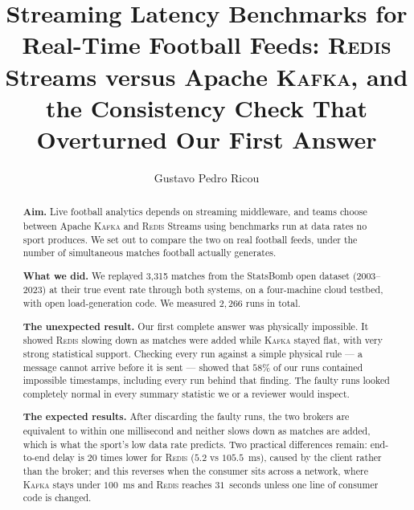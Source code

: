 \documentclass[Afour,sageh,times]{sagej}
\newcommand{\redis}{\textsc{Redis}}
\newcommand{\kafka}{\textsc{Kafka}}
\begin{document}

\title{Streaming Latency Benchmarks for Real-Time Football Feeds: \redis{} Streams versus Apache \kafka{}, and the Consistency Check That Overturned Our First Answer}

\author{Gustavo Pedro Ricou}




\begin{abstract}
\textbf{Aim.} Live football analytics depends on streaming middleware, and teams choose between
Apache \kafka{} and \redis{} Streams using benchmarks run at data rates no sport produces. We set
out to compare the two on real football feeds, under the number of simultaneous matches football
actually generates.

\textbf{What we did.} We replayed 3{,}315 matches from the StatsBomb open dataset (2003--2023) at
their true event rate through both systems, on a four-machine cloud testbed, with open
load-generation code. We measured $2{,}266$ runs in total.

\textbf{The unexpected result.} Our first complete answer was physically impossible. It showed
\redis{} slowing down as matches were added while \kafka{} stayed flat, with very strong
statistical support. Checking every run against a simple physical rule --- a message cannot
arrive before it is sent --- showed that $58\%$ of our runs contained impossible timestamps,
including every run behind that finding. The faulty runs looked completely normal in every
summary statistic we or a reviewer would inspect.

\textbf{The expected results.} After discarding the faulty runs, the two brokers are equivalent
to within one millisecond and neither slows down as matches are added, which is what the
sport's low data rate predicts. Two practical differences remain: end-to-end delay is 20 times
lower for \redis{} ($5.2$ vs $105.5$~ms), caused by the client rather than the broker; and this
reverses when the consumer sits across a network, where \kafka{} stays under $100$~ms and
\redis{} reaches $31$~seconds unless one line of consumer code is changed.
\end{abstract}
\end{document}
